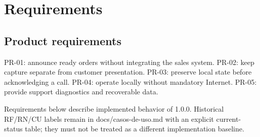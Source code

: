 \section{Requirements}
\subsection{Product requirements}

PR-01: announce ready orders without integrating the sales system. PR-02: keep capture separate from customer presentation. PR-03: preserve local state before acknowledging a call. PR-04: operate locally without mandatory Internet. PR-05: provide support diagnostics and recoverable data.

Requirements below describe implemented behavior of 1.0.0. Historical RF/RN/CU labels remain in docs/casos-de-uso.md with an explicit current-status table; they must not be treated as a different implementation baseline.
